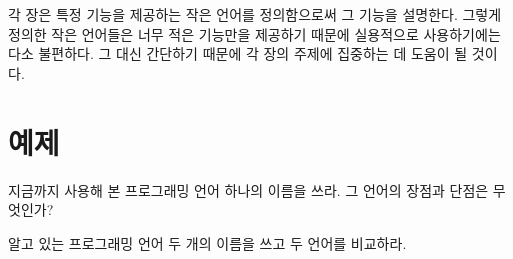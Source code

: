 각 장은 특정 기능을 제공하는 작은 언어를 정의함으로써 그 기능을 설명한다. 그렇게 정의한 작은 언어들은 너무 적은 기능만을 제공하기 때문에 실용적으로 사용하기에는 다소 불편하다. 그 대신 간단하기 때문에 각 장의 주제에 집중하는 데 도움이 될 것이다.

\section{예제}

\begin{exercise}

지금까지 사용해 본 프로그래밍 언어 하나의 이름을 쓰라. 그 언어의 장점과 단점은 무엇인가?

\end{exercise}

\begin{exercise}

알고 있는 프로그래밍 언어 두 개의 이름을 쓰고 두 언어를 비교하라.

\end{exercise}

